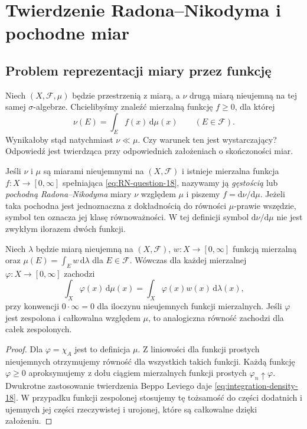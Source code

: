 \chapter[Twierdzenie Radona--Nikodyma]{Twierdzenie Radona--Nikodyma i pochodne miar}
\label{ch:radon-nikodym-18}

\section{Problem reprezentacji miary przez funkcję}
Niech $(X,\mathcal F,\mu)$ będzie przestrzenią z miarą,
a $\nu$ drugą miarą nieujemną na tej samej $\sigma$-algebrze.
Chcielibyśmy znaleźć mierzalną funkcję $f\ge0$, dla której
\begin{equation}\label{eq:RN-question-18}
\nu(E)=\int_E f(x)\,\mathrm d\mu(x)
\qquad(E\in\mathcal F).
\end{equation}
Wynikałoby stąd natychmiast $\nu\ll\mu$.
Czy warunek ten jest wystarczający? Odpowiedź jest twierdząca
przy odpowiednich założeniach o skończoności miar.

\begin{definicja}
\label{def:RN-derivative-18}
Jeśli $\nu$ i $\mu$ są miarami nieujemnymi na $(X,\mathcal F)$
i istnieje mierzalna funkcja $f:X\to[0,\infty]$
spełniająca \eqref{eq:RN-question-18}, nazywamy ją
\emph{gęstością} lub \emph{pochodną Radona--Nikodyma}
miary $\nu$ względem $\mu$ i piszemy
$f=\mathrm d\nu/\mathrm d\mu$. Jeżeli taka pochodna
jest jednoznaczna z dokładnością do równości $\mu$-prawie
wszędzie, symbol ten oznacza jej klasę równoważności.
W tej definicji symbol $\mathrm d\nu/\mathrm d\mu$
nie jest zwykłym ilorazem dwóch funkcji.
\end{definicja}

\begin{lemat}
\label{lem:integration-density-18}
Niech $\lambda$ będzie miarą nieujemną na $(X,\mathcal F)$,
$w:X\to[0,\infty]$ funkcją mierzalną oraz
$\mu(E)=\int_Ew\,\mathrm d\lambda$ dla $E\in\mathcal F$.
Wówczas dla każdej mierzalnej $\varphi:X\to[0,\infty]$
zachodzi
\begin{equation}\label{eq:integration-density-18}
\int_X\varphi(x)\,\mathrm d\mu(x)
=\int_X\varphi(x)w(x)\,\mathrm d\lambda(x),
\end{equation}
przy konwencji $0\cdot\infty=0$ dla iloczynu
nieujemnych funkcji mierzalnych. Jeśli $\varphi$ jest
zespolona i całkowalna względem $\mu$, to analogiczna
równość zachodzi dla całek zespolonych.
\end{lemat}
\begin{proof}
Dla $\varphi=\chi_A$ jest to definicja $\mu$.
Z liniowości dla funkcji prostych nieujemnych otrzymujemy
równość dla wszystkich takich funkcji. Każdą funkcję
$\varphi\ge0$ aproksymujemy z dołu ciągiem mierzalnych
funkcji prostych $\varphi_n\uparrow\varphi$.
Dwukrotne zastosowanie twierdzenia Beppo Leviego
daje \eqref{eq:integration-density-18}. W przypadku
funkcji zespolonej stosujemy tę tożsamość do części
dodatnich i ujemnych jej części rzeczywistej i urojonej,
które są całkowalne dzięki założeniu.
\end{proof}

